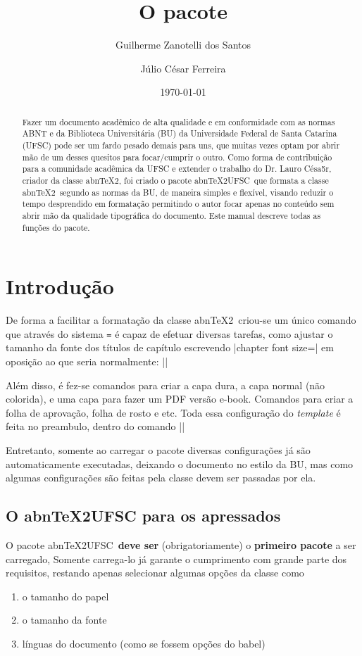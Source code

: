 \documentclass[openright]{memoir}
\title{\sffamily O pacote \abntexUFSC}
\date{\today}
\author{Guilherme Zanotelli dos Santos\and Júlio César Ferreira}
\newcommand*{\abntex}{abn\TeX2}
\newcommand*{\abntexUFSC}{abn\TeX2UFSC}
\newcommand{\emingles}[1]{\foreignlanguage{english}{\textit{#1}}}
\begin{document}
\pagestyle{simple}
\frontmatter
\maketitle
\begin{abstract}
Fazer um documento acadêmico de alta qualidade e em conformidade com as normas ABNT e da Biblioteca Universitária (BU) da Universidade Federal de Santa Catarina (UFSC) pode ser um fardo pesado demais para uns, que muitas vezes optam por abrir mão de um desses quesitos para focar/cumprir o outro. Como forma de contribuição para a comunidade acadêmica da UFSC e extender o trabalho do Dr. Lauro Césa5r, criador da classe \abntex, foi criado o pacote \abntexUFSC\ que formata a classe \abntex\ segundo as normas da BU, de maneira simples e flexível, visando reduzir o tempo desprendido em formatação permitindo o autor focar apenas no conteúdo sem abrir mão da qualidade tipográfica do documento. Este manual descreve todas as funções do pacote.
\end{abstract}
\tableofcontents*
\mainmatter
\chapter{Introdução}
De forma a facilitar a formatação da classe \abntex\ criou-se um único comando que através do sistema \texttt{=} é capaz de efetuar diversas tarefas, como ajustar o tamanho da fonte dos títulos de capítulo escrevendo \displaycode|chapter font size=\huge| em oposição ao que seria normalmente: \displaycode|\renewcommand{\ABNTEXchapterfontsize}{\huge}|

Além disso, é fez-se comandos para criar a capa dura, a capa normal (não colorida), e uma capa para fazer um PDF versão e-book. Comandos para criar a folha de aprovação, folha de rosto e etc. Toda essa configuração do \emingles{template} é feita no preambulo, dentro do comando \displaycode||

Entretanto, somente ao carregar o pacote diversas configurações já são automaticamente executadas, deixando o documento no estilo da BU, mas como algumas configurações são feitas pela classe devem ser passadas por ela.

\section{O \texorpdfstring{\abntexUFSC}{abnTeX2UFSC} para os apressados}
O pacote \abntexUFSC\ \textbf{deve ser} (obrigatoriamente) o \textbf{primeiro pacote} a ser carregado, Somente carrega-lo já garante o cumprimento com grande parte dos requisitos, restando apenas selecionar algumas opções da classe como \begin{enumerate}
\item o tamanho do papel
\item o tamanho da fonte
\item línguas do documento (como se fossem opções do babel)
\end{enumerate}
\end{document}
